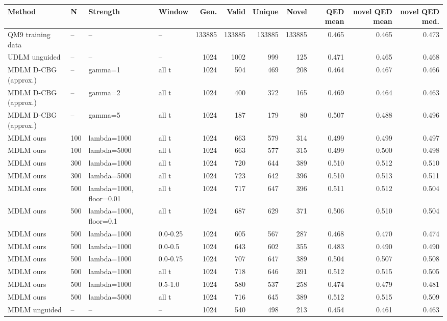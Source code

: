 \begin{tabular}{llllrrrrrrr}
\toprule
Method & N & Strength & Window & Gen. & Valid & Unique & Novel & QED mean & novel QED mean & novel QED med. \\
\midrule
QM9 training data & -- & -- & -- & 133885 & 133885 & 133885 & 133885 & 0.465 & 0.465 & 0.473 \\
UDLM unguided & -- & -- & -- & 1024 & 1002 & 999 & 125 & 0.471 & 0.465 & 0.468 \\
MDLM D-CBG (approx.) & -- & gamma=1 & all t & 1024 & 504 & 469 & 208 & 0.464 & 0.467 & 0.466 \\
MDLM D-CBG (approx.) & -- & gamma=2 & all t & 1024 & 400 & 372 & 165 & 0.469 & 0.464 & 0.463 \\
MDLM D-CBG (approx.) & -- & gamma=5 & all t & 1024 & 187 & 179 & 80 & 0.507 & 0.488 & 0.496 \\
MDLM ours & 100 & lambda=1000 & all t & 1024 & 663 & 579 & 314 & 0.499 & 0.499 & 0.497 \\
MDLM ours & 100 & lambda=5000 & all t & 1024 & 663 & 577 & 315 & 0.499 & 0.500 & 0.498 \\
MDLM ours & 300 & lambda=1000 & all t & 1024 & 720 & 644 & 389 & 0.510 & 0.512 & 0.510 \\
MDLM ours & 300 & lambda=5000 & all t & 1024 & 723 & 642 & 396 & 0.510 & 0.513 & 0.511 \\
MDLM ours & 500 & lambda=1000, floor=0.01 & all t & 1024 & 717 & 647 & 396 & 0.511 & 0.512 & 0.504 \\
MDLM ours & 500 & lambda=1000, floor=0.1 & all t & 1024 & 687 & 629 & 371 & 0.506 & 0.510 & 0.504 \\
MDLM ours & 500 & lambda=1000 & 0.0-0.25 & 1024 & 605 & 567 & 287 & 0.468 & 0.470 & 0.474 \\
MDLM ours & 500 & lambda=1000 & 0.0-0.5 & 1024 & 643 & 602 & 355 & 0.483 & 0.490 & 0.490 \\
MDLM ours & 500 & lambda=1000 & 0.0-0.75 & 1024 & 707 & 647 & 389 & 0.504 & 0.507 & 0.508 \\
MDLM ours & 500 & lambda=1000 & all t & 1024 & 718 & 646 & 391 & 0.512 & 0.515 & 0.505 \\
MDLM ours & 500 & lambda=1000 & 0.5-1.0 & 1024 & 580 & 537 & 258 & 0.474 & 0.479 & 0.481 \\
MDLM ours & 500 & lambda=5000 & all t & 1024 & 716 & 645 & 389 & 0.512 & 0.515 & 0.509 \\
MDLM unguided & -- & -- & -- & 1024 & 540 & 498 & 213 & 0.454 & 0.461 & 0.463 \\

\end{tabular}
